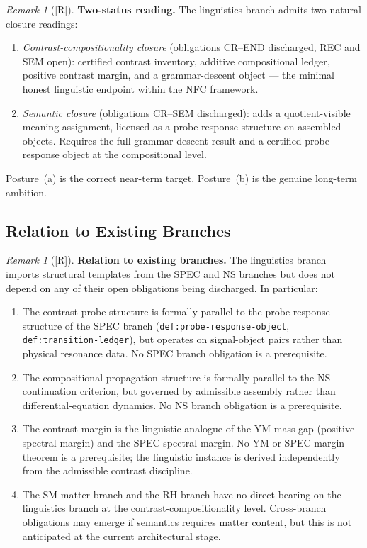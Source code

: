 \documentclass[12pt,oneside]{amsbook}
\theoremstyle{plain}
\theoremstyle{definition}
\theoremstyle{remark}
\newtheorem{remark}[theorem]{Remark}
\newcommand{\status}[1]{\textup{[#1]}}
\begin{document}
\begin{remark}[\status{R}]\label{rem:ling-two-status}
\textbf{Two-status reading.}
The linguistics branch admits two natural closure readings:
\begin{enumerate}[label=\textup{(\alph*)}]
 \item \emph{Contrast-compositionality closure} (obligations CR--END
 discharged, REC and SEM open): certified contrast inventory,
 additive compositional ledger, positive contrast margin, and a
 grammar-descent object --- the minimal honest linguistic endpoint
 within the NFC framework.
 \item \emph{Semantic closure} (obligations CR--SEM discharged): adds
 a quotient-visible meaning assignment, licensed as a probe-response
 structure on assembled objects. Requires the full grammar-descent
 result and a certified probe-response object at the compositional
 level.
\end{enumerate}
Posture~(a) is the correct near-term target. Posture~(b) is the
genuine long-term ambition.
\end{remark}

\subsection{Relation to Existing Branches}

\begin{remark}[\status{R}]\label{rem:ling-branch-relations}
\textbf{Relation to existing branches.}
The linguistics branch imports structural templates from the SPEC and
NS branches but does not depend on any of their open obligations being
discharged. In particular:
\begin{enumerate}[label=\textup{(\arabic*)}]
 \item The contrast-probe structure is formally parallel to the
 probe-response structure of the SPEC branch (\texttt{def:probe-response-object},
 \texttt{def:transition-ledger}), but operates on signal-object
 pairs rather than physical resonance data. No SPEC branch
 obligation is a prerequisite.
 \item The compositional propagation structure is formally parallel to
 the NS continuation criterion, but governed by admissible assembly
 rather than differential-equation dynamics. No NS branch
 obligation is a prerequisite.
 \item The contrast margin is the linguistic analogue of the YM mass
 gap (positive spectral margin) and the SPEC spectral margin. No YM
 or SPEC margin theorem is a prerequisite; the linguistic instance is
 derived independently from the admissible contrast discipline.
 \item The SM matter branch and the RH branch have no direct bearing
 on the linguistics branch at the contrast-compositionality level.
 Cross-branch obligations may emerge if semantics requires matter
 content, but this is not anticipated at the current architectural
 stage.
\end{enumerate}
\end{remark}
\end{document}

